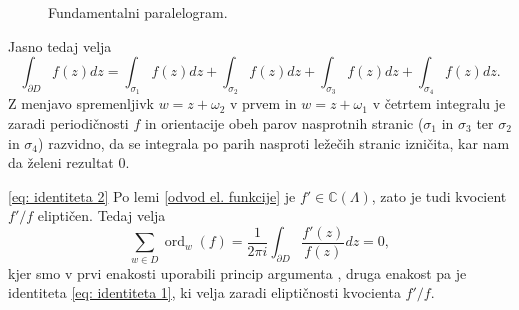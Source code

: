 \documentclass[mat1]{fmfdelo}
\numberwithin{equation}{section}
\newcommand{\C}{\mathbb C}
\newcommand{\om}{\omega}
\newcommand{\elf}{\C(\Lambda)}
\newcommand{\ord}[2]{\operatorname{ord}_{#1}(#2)}
\theoremstyle{definition}
\begin{document}
\begin{dokaz}
\begin{figure}[H]
        \caption{Fundamentalni paralelogram.}
        \label{fundamentalni paralelogram}
    \end{figure}


    Jasno tedaj velja
    \[
        \int_{\partial D} f(z)dz = \int_{\sigma_1} f(z)dz + \int_{\sigma_2} f(z)dz + \int_{\sigma_3} f(z)dz + \int_{\sigma_4} f(z)dz.
    \]
    Z menjavo spremenljivk $w = z + \om_2$ v prvem in $w = z + \om_1$ v četrtem integralu je zaradi periodičnosti $f$ in orientacije obeh parov nasprotnih stranic ($\sigma_1$ in $\sigma_3$ ter $\sigma_2$ in $\sigma_4$) razvidno, da se integrala po parih nasproti ležečih stranic izničita, kar nam da želeni rezultat $0$.
    
    \eqref{eq: identiteta 2} Po lemi \ref{odvod el. funkcije} je $f' \in \elf$, zato je tudi kvocient $f'/f$ eliptičen. Tedaj velja
    \[
        \sum_{w \in D} \ord{w}{f} = \frac{1}{2\pi i}\int_{\partial D} \frac{f'(z)}{f(z)}dz = 0, 
    \]
    kjer smo v prvi enakosti uporabili princip argumenta \cite[Izrek 72]{Globevnik}, druga enakost pa je identiteta \eqref{eq: identiteta 1}, ki velja zaradi eliptičnosti kvocienta $f'/f$.


\end{dokaz}
\end{document}

